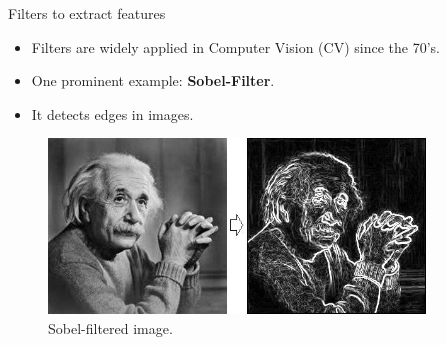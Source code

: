 \begin{vbframe}{Filters to extract features}
    \begin{itemize}
        \item Filters are widely applied in Computer Vision (CV) since the 70's.
        \item One prominent example: \textbf{Sobel-Filter}.
        \item It detects edges in images.
    \end{itemize}
    \begin{figure}
        \centering
        \includegraphics[width=10cm]{figure/sobel_einstein.png}
        \caption{Sobel-filtered image.}
    \end{figure}
\framebreak


\end{vbframe}
